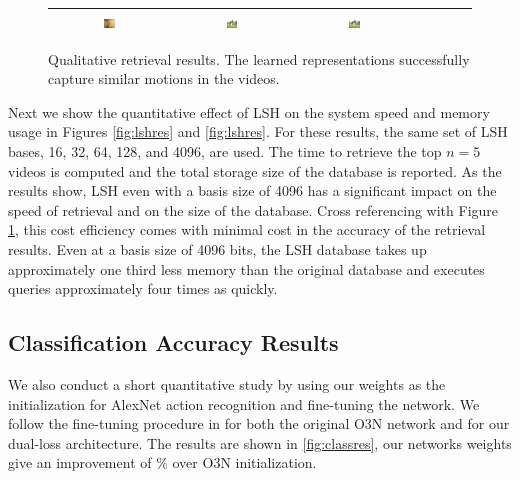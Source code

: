 \begin{figure}[t]
\begin{center}
\begin{tabular}{|c|c|ccccc|}
          \includegraphics[width=0.1\textwidth]{images/ret_results/writing/64.png} & 
          \includegraphics[width=0.1\textwidth]{images/ret_results/writing/128.png} & 
          \includegraphics[width=0.1\textwidth]{images/ret_results/writing/4096.png} \\ \hline            
        \end{tabular}
        \caption{Qualitative retrieval results. The learned representations successfully capture similar motions in the videos.}
        \label{fig:retres}
    \end{center}
\end{figure}

Next we show the quantitative effect of LSH on the system speed and memory usage in Figures \ref{fig:lshres} and \ref{fig:lshres}. For these results, the same set of LSH bases, 16, 32, 64, 128, and 4096, are used. The time to retrieve the top $n=5$ videos is computed and the total storage size of the database is reported. As the results show, LSH even with a basis size of 4096 has a significant impact on the speed of retrieval and on the size of the database. Cross referencing with Figure \ref{fig:retres}, this cost efficiency comes with minimal cost in the accuracy of the retrieval results. Even at a basis size of 4096 bits, the LSH database takes up approximately one third less memory than the original database and executes queries approximately four times as quickly.

\subsection{Classification Accuracy Results}

We also conduct a short quantitative study by using our weights as the initialization for AlexNet action recognition and fine-tuning the network. We follow the fine-tuning procedure in \cite{fernando2017self} for both the original O3N network and for our dual-loss architecture. The results are shown in \ref{fig:classres}, our networks weights give an improvement of \todo\% over O3N initialization.

